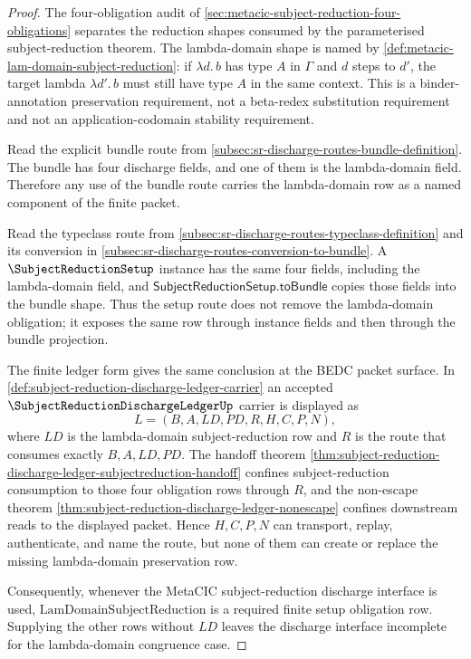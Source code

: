 \begin{proof}
The four-obligation audit of \autoref{sec:metacic-subject-reduction-four-obligations} separates the reduction shapes consumed by the parameterised subject-reduction theorem. The lambda-domain shape is named by \autoref{def:metacic-lam-domain-subject-reduction}: if $\lambda d.\,b$ has type $A$ in $\Gamma$ and $d$ steps to $d'$, the target lambda $\lambda d'.\,b$ must still have type $A$ in the same context. This is a binder-annotation preservation requirement, not a beta-redex substitution requirement and not an application-codomain stability requirement.

Read the explicit bundle route from \autoref{subsec:sr-discharge-routes-bundle-definition}. The bundle has four discharge fields, and one of them is the lambda-domain field. Therefore any use of the bundle route carries the lambda-domain row as a named component of the finite packet.

Read the typeclass route from \autoref{subsec:sr-discharge-routes-typeclass-definition} and its conversion in \autoref{subsec:sr-discharge-routes-conversion-to-bundle}. A $\SubjectReductionSetup$ instance has the same four fields, including the lambda-domain field, and $\mathsf{SubjectReductionSetup.toBundle}$ copies those fields into the bundle shape. Thus the setup route does not remove the lambda-domain obligation; it exposes the same row through instance fields and then through the bundle projection.

The finite ledger form gives the same conclusion at the BEDC packet surface. In \autoref{def:subject-reduction-discharge-ledger-carrier} an accepted $\SubjectReductionDischargeLedgerUp$ carrier is displayed as
$$
L=(B,A,LD,PD,R,H,C,P,N),
$$
where $LD$ is the lambda-domain subject-reduction row and $R$ is the route that consumes exactly $B,A,LD,PD$. The handoff theorem \autoref{thm:subject-reduction-discharge-ledger-subjectreduction-handoff} confines subject-reduction consumption to those four obligation rows through $R$, and the non-escape theorem \autoref{thm:subject-reduction-discharge-ledger-nonescape} confines downstream reads to the displayed packet. Hence $H,C,P,N$ can transport, replay, authenticate, and name the route, but none of them can create or replace the missing lambda-domain preservation row.

Consequently, whenever the MetaCIC subject-reduction discharge interface is used, $\mathrm{LamDomainSubjectReduction}$ is a required finite setup obligation row. Supplying the other rows without $LD$ leaves the discharge interface incomplete for the lambda-domain congruence case.
\end{proof}

